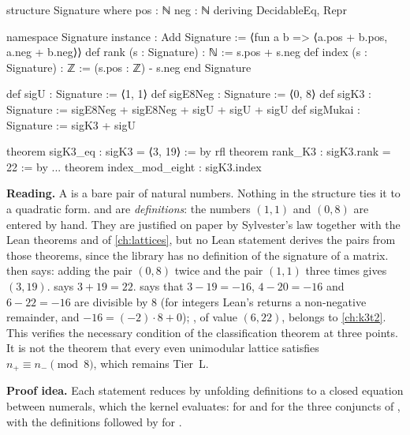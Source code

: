 \begin{leanbox}
\begin{leancode}
structure Signature where
  pos : ℕ
  neg : ℕ
  deriving DecidableEq, Repr

namespace Signature
instance : Add Signature := ⟨fun a b => ⟨a.pos + b.pos, a.neg + b.neg⟩⟩
def rank (s : Signature) : ℕ := s.pos + s.neg
def index (s : Signature) : ℤ := (s.pos : ℤ) - s.neg
end Signature

def sigU : Signature := ⟨1, 1⟩
def sigE8Neg : Signature := ⟨0, 8⟩
def sigK3 : Signature := sigE8Neg + sigE8Neg + sigU + sigU + sigU
def sigMukai : Signature := sigK3 + sigU

theorem sigK3_eq : sigK3 = ⟨3, 19⟩ := by rfl
theorem rank_K3 : sigK3.rank = 22 := by ...
theorem index_mod_eight :
    sigK3.index %
\end{leancode}
\textbf{Reading.} A  is a bare pair of natural numbers. Nothing in the
structure ties it to a quadratic form.  and  are
\emph{definitions}: the numbers $(1,1)$ and $(0,8)$ are entered by hand. They are justified
on paper by Sylvester's law together with the Lean theorems 
and  of \cref{ch:lattices}, but no Lean statement derives the pairs
from those theorems, since the library has no definition of the signature of a matrix.
 then says: adding the pair $(0,8)$ twice and the pair $(1,1)$ three times
gives $(3,19)$.  says $3+19=22$.  says that
$3-19=-16$, $4-20=-16$ and $6-22=-16$ are divisible by $8$ (for integers Lean's \lean{\%}
returns a non-negative remainder, and $-16=(-2)\cdot8+0$); , of value $(6,22)$,
belongs to \cref{ch:k3t2}. This verifies the necessary condition of the classification
theorem at three points. It is not the theorem that every even unimodular lattice satisfies
$n_+\equiv n_-\pmod8$, which remains Tier~L.

\textbf{Proof idea.} Each statement reduces by unfolding definitions to a closed equation
between numerals, which the kernel evaluates:  for  and for the
three conjuncts of ,  with the definitions followed by
 for .
\end{leanbox}

